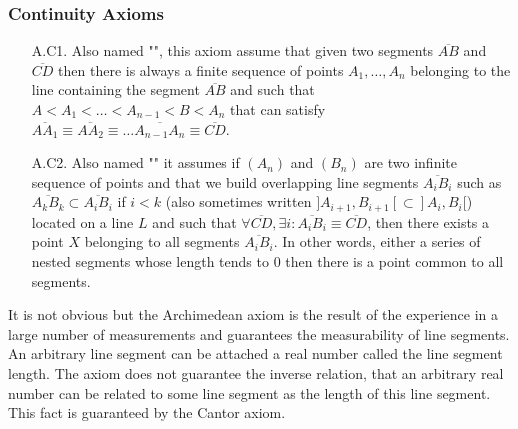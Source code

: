 	\subsubsection{Continuity Axioms}
	\begin{enumerate}
		\item[A.C1.] Also named "", this axiom assume that given two segments $\overline{AB}$ and $\overline{CD}$ then there is always a finite sequence of points $A_1,\ldots, A_n$ belonging to the line containing the segment $\overline{AB}$  and such that $A<A_1<\ldots<A_{n-1}<B<A_n$ that can satisfy $\overline{AA_1}\equiv \overline{AA_2}\equiv\ldots \overline{A_{n-1}A_n}\equiv \overline{CD}$.
	
		\item[A.C2.] Also named "" it assumes if $(A_n)$ and $(B_n)$ are two infinite sequence of points and that we build overlapping line segments $\overline{A_iB_i}$ such as $\overline{A_{k}B_{k}} \subset \overline{A_iB_i}$ if $i<k$ (also sometimes written $]A_{i+1},B_{i+1}[\subset]A_i,B_i[$) located on a line $L$ and such that $\forall \overline{CD},\exists i: \overline{A_iB_i}\equiv\overline{CD}$, then there exists a point $X$ belonging to all segments $\overline{A_iB_i}$. In other words, either a series of nested segments whose length tends to $0$ then there is a point common to all segments.
	\end{enumerate}
	It is not obvious but the Archimedean axiom is the result of the experience in a large number of measurements and guarantees the measurability of line segments. An arbitrary line segment can be attached a real number called the line segment length. The axiom does not guarantee the inverse relation, that an arbitrary real number can be related to some line segment as the length of this line segment. This fact is guaranteed by the Cantor axiom.


